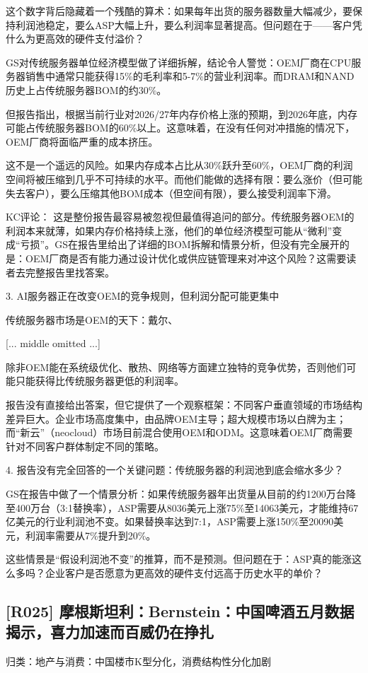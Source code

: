 \documentclass[11pt]{ctexart}
\begin{document}
这个数字背后隐藏着一个残酷的算术：如果每年出货的服务器数量大幅减少，要保持利润池稳定，要么ASP大幅上升，要么利润率显著提高。但问题在于——客户凭什么为更高效的硬件支付溢价？

GS对传统服务器单位经济模型做了详细拆解，结论令人警觉：OEM厂商在CPU服务器销售中通常只能获得15\%的毛利率和5-7\%的营业利润率。而DRAM和NAND历史上占传统服务器BOM的约30\%。

但报告指出，根据当前行业对2026/27年内存价格上涨的预期，到2026年底，内存可能占传统服务器BOM的60\%以上。这意味着，在没有任何对冲措施的情况下，OEM厂商将面临严重的成本挤压。

这不是一个遥远的风险。如果内存成本占比从30\%跃升至60\%，OEM厂商的利润空间将被压缩到几乎不可持续的水平。而他们能做的选择有限：要么涨价（但可能失去客户），要么压缩其他BOM成本（但空间有限），要么接受利润率下滑。

KC评论： 这是整份报告最容易被忽视但最值得追问的部分。传统服务器OEM的利润本来就薄，如果内存价格持续上涨，他们的单位经济模型可能从“微利”变成“亏损”。GS在报告里给出了详细的BOM拆解和情景分析，但没有完全展开的是：OEM厂商是否有能力通过设计优化或供应链管理来对冲这个风险？这需要读者去完整报告里找答案。

3. AI服务器正在改变OEM的竞争规则，但利润分配可能更集中

传统服务器市场是OEM的天下：戴尔、

[... middle omitted ...]

除非OEM能在系统级优化、散热、网络等方面建立独特的竞争优势，否则他们可能只能获得比传统服务器更低的利润率。

报告没有直接给出答案，但它提供了一个观察框架：不同客户垂直领域的市场结构差异巨大。企业市场高度集中，由品牌OEM主导；超大规模市场以白牌为主；而“新云”（neocloud）市场目前混合使用OEM和ODM。这意味着OEM厂商需要针对不同客户群体制定不同的策略。

4. 报告没有完全回答的一个关键问题：传统服务器的利润池到底会缩水多少？

GS在报告中做了一个情景分析：如果传统服务器年出货量从目前的约1200万台降至400万台（3:1替换率），ASP需要从8036美元上涨75\%至14063美元，才能维持67亿美元的行业利润池不变。如果替换率达到7:1，ASP需要上涨150\%至20090美元，利润率需要从7\%提升到20\%。

这些情景是“假设利润池不变”的推算，而不是预测。但问题在于：ASP真的能涨这么多吗？企业客户是否愿意为更高效的硬件支付远高于历史水平的单价？

\subsection{[R025] 摩根斯坦利：Bernstein：中国啤酒五月数据揭示，喜力加速而百威仍在挣扎}
{\small\color{refgray}归类：地产与消费：中国楼市K型分化，消费结构性分化加剧}
\end{document}
